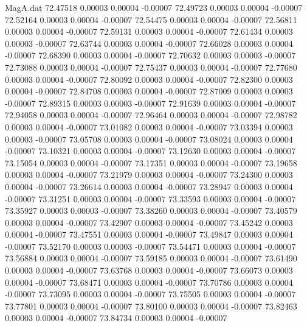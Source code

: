 \begin{filecontents}{MagA.dat}
  72.47518    0.00003    0.00004   -0.00007
  72.49723    0.00003    0.00004   -0.00007
  72.52164    0.00003    0.00004   -0.00007
  72.54475    0.00003    0.00004   -0.00007
  72.56811    0.00003    0.00004   -0.00007
  72.59131    0.00003    0.00004   -0.00007
  72.61434    0.00003    0.00003   -0.00007
  72.63744    0.00003    0.00004   -0.00007
  72.66028    0.00003    0.00004   -0.00007
  72.68390    0.00003    0.00004   -0.00007
  72.70632    0.00003    0.00003   -0.00007
  72.73088    0.00003    0.00004   -0.00007
  72.75437    0.00003    0.00004   -0.00007
  72.77680    0.00003    0.00004   -0.00007
  72.80092    0.00003    0.00004   -0.00007
  72.82300    0.00003    0.00004   -0.00007
  72.84708    0.00003    0.00004   -0.00007
  72.87009    0.00003    0.00003   -0.00007
  72.89315    0.00003    0.00003   -0.00007
  72.91639    0.00003    0.00004   -0.00007
  72.94058    0.00003    0.00004   -0.00007
  72.96464    0.00003    0.00004   -0.00007
  72.98782    0.00003    0.00004   -0.00007
  73.01082    0.00003    0.00004   -0.00007
  73.03394    0.00003    0.00003   -0.00007
  73.05708    0.00003    0.00004   -0.00007
  73.08024    0.00003    0.00004   -0.00007
  73.10321    0.00003    0.00004   -0.00007
  73.12630    0.00003    0.00004   -0.00007
  73.15054    0.00003    0.00004   -0.00007
  73.17351    0.00003    0.00004   -0.00007
  73.19658    0.00003    0.00004   -0.00007
  73.21979    0.00003    0.00004   -0.00007
  73.24300    0.00003    0.00004   -0.00007
  73.26614    0.00003    0.00004   -0.00007
  73.28947    0.00003    0.00004   -0.00007
  73.31251    0.00003    0.00004   -0.00007
  73.33593    0.00003    0.00004   -0.00007
  73.35927    0.00003    0.00003   -0.00007
  73.38260    0.00003    0.00004   -0.00007
  73.40579    0.00003    0.00004   -0.00007
  73.42907    0.00003    0.00004   -0.00007
  73.45242    0.00003    0.00004   -0.00007
  73.47551    0.00003    0.00004   -0.00007
  73.49847    0.00003    0.00004   -0.00007
  73.52170    0.00003    0.00003   -0.00007
  73.54471    0.00003    0.00004   -0.00007
  73.56884    0.00003    0.00004   -0.00007
  73.59185    0.00003    0.00004   -0.00007
  73.61490    0.00003    0.00004   -0.00007
  73.63768    0.00003    0.00004   -0.00007
  73.66073    0.00003    0.00004   -0.00007
  73.68471    0.00003    0.00004   -0.00007
  73.70786    0.00003    0.00004   -0.00007
  73.73095    0.00003    0.00004   -0.00007
  73.75505    0.00003    0.00004   -0.00007
  73.77801    0.00003    0.00004   -0.00007
  73.80100    0.00003    0.00004   -0.00007
  73.82463    0.00003    0.00004   -0.00007
  73.84734    0.00003    0.00004   -0.00007

\end{filecontents}
